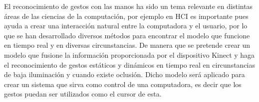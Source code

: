 
El reconocimiento de gestos con las manos ha sido un tema relevante en distintas áreas de las ciencias de la computación, por ejemplo en HCI es importante pues ayuda a crear una interacción natural entre la computadora y el usuario, por lo que se han desarrollado diversos m\'etodos para encontrar el modelo que funcione en tiempo real y en diversas circunstancias. De manera que se pretende crear un modelo que fusione la información proporcionada por el dispositivo Kinect y haga el reconocimiento de gestos estáticos y dinámicos en tiempo real en circunstancias de baja iluminación y cuando existe oclusión. Dicho modelo ser\'a aplicado para crear un sistema que sirva como control de una computadora, es decir que los gestos puedan ser utilizados como el cursor de esta.